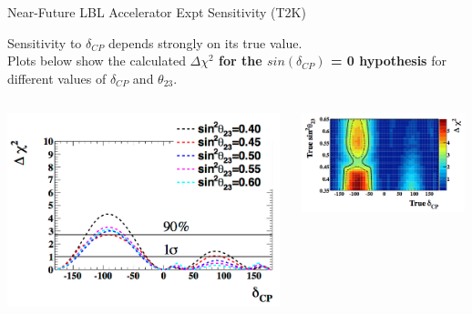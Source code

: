 \begin{frame}{Near-Future LBL Accelerator Expt Sensitivity (T2K)}

 {\small \centering
   Sensitivity to $\delta_{CP}$ depends strongly on its true value.\\
   Plots below show the calculated {\bf $\Delta\chi^{2}$ for the $sin({\delta}_{CP})$ = 0 hypothesis}
   for different values of $\delta_{CP}$ and $\theta_{23}$.\\
 }

\begin{columns}[T]
  \begin{column}{0.48\textwidth}
  {
    \begin{center}
      \includegraphics[width=0.99\textwidth,height=0.45\textheight]{./images/3nu/accelerator/future_sensitivity/t2k/exclude_sindelta0_50nu50nubar_nh_selected_theta23.png}\\
    \end{center}
  }
  \end{column}
  \begin{column}{0.52\textwidth}
    \begin{center}
      \vspace{0.3cm}
      \includegraphics[width=0.99\textwidth,height=0.45\textheight]{./images/3nu/accelerator/future_sensitivity/t2k/exclude_sindelta0_50nu50nubar_nh.png}\\

\end{center}
\end{column}
\end{columns}
\end{frame}
